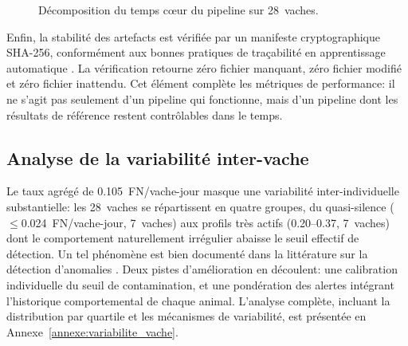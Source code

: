 \begin{figure}[H]
    \centering
    \caption{Décomposition du temps cœur du pipeline sur 28~vaches.}
    \label{fig:time_breakdown}
\end{figure}

Enfin, la stabilité des artefacts est vérifiée par un manifeste cryptographique SHA-256,
conformément aux bonnes pratiques de traçabilité en apprentissage automatique
\citep{sculley2015hidden}. La vérification retourne zéro fichier manquant, zéro fichier
modifié et zéro fichier inattendu. Cet élément complète les métriques de performance: il ne
s'agit pas seulement d'un pipeline qui fonctionne, mais d'un pipeline dont les résultats de
référence restent contrôlables dans le temps.

\FloatBarrier

\subsection{Analyse de la variabilité inter-vache}
\label{subsec:analyse_par_vache}

Le taux agrégé de 0.105~FN/vache-jour masque une variabilité inter-individuelle
substantielle: les 28~vaches se répartissent en quatre groupes, du quasi-silence
($\leq$0.024~FN/vache-jour, 7~vaches) aux profils très actifs (0.20--0.37, 7~vaches)
dont le comportement naturellement irrégulier abaisse le seuil effectif de détection.
Un tel phénomène est bien documenté dans la littérature sur la détection d'anomalies
\citep{chandola2009anomaly}. Deux pistes d'amélioration en découlent: une calibration
individuelle du seuil de contamination, et une pondération des alertes intégrant
l'historique comportemental de chaque animal. L'analyse complète, incluant la distribution
par quartile et les mécanismes de variabilité, est présentée en
Annexe~\ref{annexe:variabilite_vache}.

